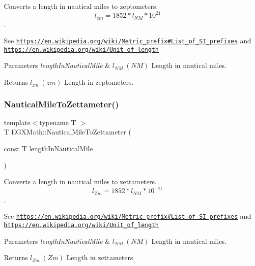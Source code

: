Converts a length in nautical miles to zeptometers. \[ l_{zm}=1852 * l_{NM} * 10^{21} \]. 

See \href{https://en.wikipedia.org/wiki/Metric_prefix#List_of_SI_prefixes}{\tt https\+://en.\+wikipedia.\+org/wiki/\+Metric\+\_\+prefix\#\+List\+\_\+of\+\_\+\+S\+I\+\_\+prefixes} and \href{https://en.wikipedia.org/wiki/Unit_of_length}{\tt https\+://en.\+wikipedia.\+org/wiki/\+Unit\+\_\+of\+\_\+length} 
\begin{DoxyParams}{Parameters}
{\em length\+In\+Nautical\+Mile} & $ l_{NM}\ (NM)$ Length in nautical miles. \\
\hline
\end{DoxyParams}
\begin{DoxyReturn}{Returns}
$ l_{zm}\ (zm)$ Length in zeptometers. 
\end{DoxyReturn}
\mbox{\label{group___e_g_x_math-_conversions-_length_conversions-_nautical-_nautical_mile-_s_i_ga3526b4110d429ac9e322baaa4c088e2b}} 
\subsubsection{\texorpdfstring{Nautical\+Mile\+To\+Zettameter()}{NauticalMileToZettameter()}}
{\footnotesize\ttfamily template$<$typename T $>$ \\
T E\+G\+X\+Math\+::\+Nautical\+Mile\+To\+Zettameter (\begin{DoxyParamCaption}\item[{const T}]{length\+In\+Nautical\+Mile }\end{DoxyParamCaption})}



Converts a length in nautical miles to zettameters. \[ l_{Zm}=1852 * l_{NM} * 10^{-21} \]. 

See \href{https://en.wikipedia.org/wiki/Metric_prefix#List_of_SI_prefixes}{\tt https\+://en.\+wikipedia.\+org/wiki/\+Metric\+\_\+prefix\#\+List\+\_\+of\+\_\+\+S\+I\+\_\+prefixes} and \href{https://en.wikipedia.org/wiki/Unit_of_length}{\tt https\+://en.\+wikipedia.\+org/wiki/\+Unit\+\_\+of\+\_\+length} 
\begin{DoxyParams}{Parameters}
{\em length\+In\+Nautical\+Mile} & $ l_{NM}\ (NM)$ Length in nautical miles. \\
\hline
\end{DoxyParams}
\begin{DoxyReturn}{Returns}
$ l_{Zm}\ (Zm)$ Length in zettameters. 
\end{DoxyReturn}
